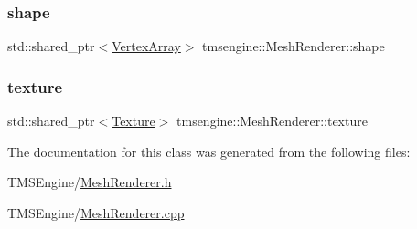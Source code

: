 \subsubsection{\texorpdfstring{shape}{shape}}
{\footnotesize\ttfamily std\+::shared\+\_\+ptr$<$\hyperlink{classtmsengine_1_1_vertex_array}{Vertex\+Array}$>$ tmsengine\+::\+Mesh\+Renderer\+::shape\hspace{0.3cm}{\ttfamily [private]}}

\mbox{\label{classtmsengine_1_1_mesh_renderer_aef2386e714dd2dfc616dc2249bc60d67}} 
\subsubsection{\texorpdfstring{texture}{texture}}
{\footnotesize\ttfamily std\+::shared\+\_\+ptr$<$\hyperlink{classtmsengine_1_1_texture}{Texture}$>$ tmsengine\+::\+Mesh\+Renderer\+::texture\hspace{0.3cm}{\ttfamily [private]}}



The documentation for this class was generated from the following files\+:\begin{DoxyCompactItemize}
\item 
T\+M\+S\+Engine/\hyperlink{_mesh_renderer_8h}{Mesh\+Renderer.\+h}\item 
T\+M\+S\+Engine/\hyperlink{_mesh_renderer_8cpp}{Mesh\+Renderer.\+cpp}\end{DoxyCompactItemize}
